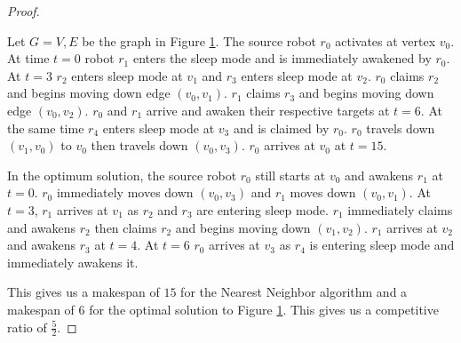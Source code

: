\documentclass[twoside]{article}
\begin{document}
\begin{multicols}{2}
\begin{proof}
\begin{figure}[H]
	\caption{}
	\label{fig:1}
	
\end{figure}

Let $G = {V, E}$ be the graph in Figure \ref{fig:1}. The source robot $r_0$ activates at vertex  $v_0$. At time $t = 0$ robot $r_1$ enters the sleep mode and is immediately awakened by $r_0$. At $t = 3$ $r_2$ enters sleep mode at $v_1$ and $r_3$ enters sleep mode at $v_2$. $r_0$ claims $r_2$ and begins moving down edge $(v_0, v_1)$. $r_1$ claims $r_3$ and begins moving down edge $(v_0, v_2)$. $r_0$ and $r_1$ arrive and awaken their respective targets at $t = 6$. At the same time $r_4$ enters sleep mode at $v_3$ and is claimed by $r_0$. $r_0$ travels down $(v_1, v_0)$ to $v_0$ then travels down $(v_0, v_3)$. $r_0$ arrives at $v_0$ at $t = 15$.

In the optimum solution, the source robot $r_0$ still starts at $v_0$ and awakens $r_1$ at $t = 0$. $r_0$ immediately moves down $(v_0, v_3)$ and $r_1$ moves down $(v_0, v_1)$. At $t = 3$, $r_1$ arrives at $v_1$ as $r_2$ and $r_3$ are entering sleep mode. $r_1$ immediately claims and awakens $r_2$ then claims $r_2$ and begins moving down $(v_1, v_2)$. $r_1$ arrives at $v_2$ and awakens $r_3$ at $t = 4$. At $t = 6$ $r_0$ arrives at $v_3$ as $r_4$ is entering sleep mode and immediately awakens it. 

This gives us a makespan of $15$ for the Nearest Neighbor algorithm and a makespan of 6 for the optimal solution to Figure \ref{fig:1}. This gives us a competitive ratio of  $\frac{5}{2}$.
\end{proof}

\end{multicols}
\end{document}
